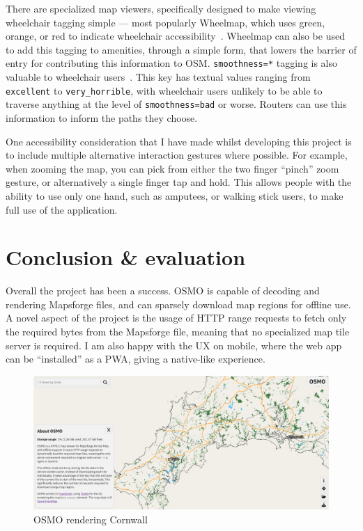 \documentclass[hyphens]{final_report}
\begin{document}
There are specialized map viewers, specifically designed to make viewing wheelchair tagging simple --- most popularly Wheelmap, which uses green, orange, or red to indicate wheelchair accessibility~\cite{wheelmap}. Wheelmap can also be used to add this tagging to amenities, through a simple form, that lowers the barrier of entry for contributing this information to OSM\@. \texttt{smoothness=*} tagging is also valuable to wheelchair users~\cite{osm-wiki-smoothness}. This key has textual values ranging from \texttt{excellent} to \texttt{very\_horrible}, with wheelchair users unlikely to be able to traverse anything at the level of \texttt{smoothness=bad} or worse. Routers can use this information to inform the paths they choose.

One accessibility consideration that I have made whilst developing this project is to include multiple alternative interaction gestures where possible. For example, when zooming the map, you can pick from either the two finger ``pinch'' zoom gesture, or alternatively a single finger tap and hold. This allows people with the ability to use only one hand, such as amputees, or walking stick users, to make full use of the application.

\clearpage
\chapter{Conclusion \& evaluation}

Overall the project has been a success. OSMO is capable of decoding and rendering Mapsforge files, and can sparsely download map regions for offline use. A novel aspect of the project is the usage of HTTP range requests to fetch only the required bytes from the Mapsforge file, meaning that no specialized map tile server is required. I am also happy with the UX on mobile, where the web app can be ``installed'' as a PWA, giving a native-like experience.

\begin{figure}[ht]
    \centering
    \includegraphics[width=\textwidth]{images/osmo.png}
    \caption{OSMO rendering Cornwall}\label{fig:osmo}
\end{figure}
\end{document}
